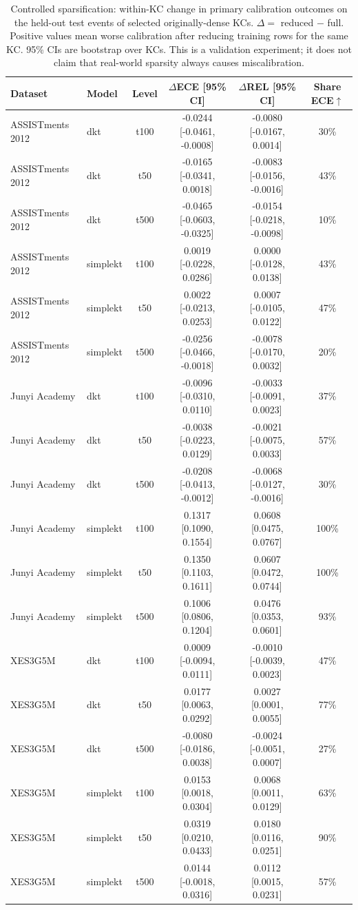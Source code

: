 \begin{table}[htbp]
\caption{Controlled sparsification: within-KC change in primary calibration outcomes on the held-out test events of selected originally-dense KCs. $\Delta = $ reduced $-$ full. Positive values mean worse calibration after reducing training rows for the same KC. 95\% CIs are bootstrap over KCs. This is a validation experiment; it does not claim that real-world sparsity always causes miscalibration.}
\label{tab:a9_sparsification}
\centering
\small
\begin{tabular}{llcccc}
\toprule
Dataset & Model & Level & $\Delta$ECE [95\% CI] & $\Delta$REL [95\% CI] & Share ECE$\uparrow$ \\
\midrule
ASSISTments 2012 & dkt & t100 & -0.0244 [-0.0461, -0.0008] & -0.0080 [-0.0167, 0.0014] & 30\% \\
ASSISTments 2012 & dkt & t50 & -0.0165 [-0.0341, 0.0018] & -0.0083 [-0.0156, -0.0016] & 43\% \\
ASSISTments 2012 & dkt & t500 & -0.0465 [-0.0603, -0.0325] & -0.0154 [-0.0218, -0.0098] & 10\% \\
ASSISTments 2012 & simplekt & t100 & 0.0019 [-0.0228, 0.0286] & 0.0000 [-0.0128, 0.0138] & 43\% \\
ASSISTments 2012 & simplekt & t50 & 0.0022 [-0.0213, 0.0253] & 0.0007 [-0.0105, 0.0122] & 47\% \\
ASSISTments 2012 & simplekt & t500 & -0.0256 [-0.0466, -0.0018] & -0.0078 [-0.0170, 0.0032] & 20\% \\
Junyi Academy & dkt & t100 & -0.0096 [-0.0310, 0.0110] & -0.0033 [-0.0091, 0.0023] & 37\% \\
Junyi Academy & dkt & t50 & -0.0038 [-0.0223, 0.0129] & -0.0021 [-0.0075, 0.0033] & 57\% \\
Junyi Academy & dkt & t500 & -0.0208 [-0.0413, -0.0012] & -0.0068 [-0.0127, -0.0016] & 30\% \\
Junyi Academy & simplekt & t100 & 0.1317 [0.1090, 0.1554] & 0.0608 [0.0475, 0.0767] & 100\% \\
Junyi Academy & simplekt & t50 & 0.1350 [0.1103, 0.1611] & 0.0607 [0.0472, 0.0744] & 100\% \\
Junyi Academy & simplekt & t500 & 0.1006 [0.0806, 0.1204] & 0.0476 [0.0353, 0.0601] & 93\% \\
XES3G5M & dkt & t100 & 0.0009 [-0.0094, 0.0111] & -0.0010 [-0.0039, 0.0023] & 47\% \\
XES3G5M & dkt & t50 & 0.0177 [0.0063, 0.0292] & 0.0027 [0.0001, 0.0055] & 77\% \\
XES3G5M & dkt & t500 & -0.0080 [-0.0186, 0.0038] & -0.0024 [-0.0051, 0.0007] & 27\% \\
XES3G5M & simplekt & t100 & 0.0153 [0.0018, 0.0304] & 0.0068 [0.0011, 0.0129] & 63\% \\
XES3G5M & simplekt & t50 & 0.0319 [0.0210, 0.0433] & 0.0180 [0.0116, 0.0251] & 90\% \\
XES3G5M & simplekt & t500 & 0.0144 [-0.0018, 0.0316] & 0.0112 [0.0015, 0.0231] & 57\% \\
\bottomrule
\end{tabular}
\end{table}
